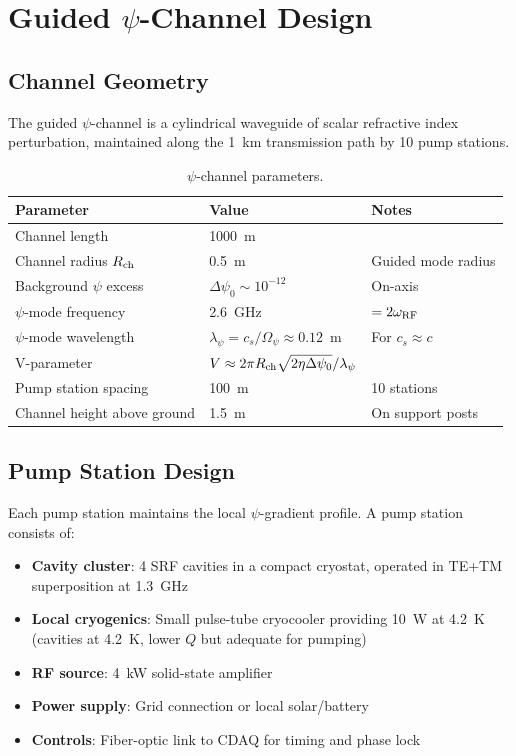 \documentclass[11pt,letterpaper]{article}
\begin{document}
\section{Guided $\psi$-Channel Design}

\subsection{Channel Geometry}

The guided $\psi$-channel is a cylindrical waveguide of scalar
refractive index perturbation, maintained along the 1~km transmission
path by 10 pump stations.

\begin{table}[H]
\caption{$\psi$-channel parameters.}
\begin{tabular}{lll}
\toprule
Parameter & Value & Notes \\
\midrule
Channel length & 1000~m & \\
Channel radius $R_{\rm ch}$ & 0.5~m & Guided mode radius \\
Background $\psi$ excess & $\Delta\psi_0 \sim 10^{-12}$ & On-axis \\
$\psi$-mode frequency & 2.6~GHz & $= 2\omega_{\rm RF}$ \\
$\psi$-mode wavelength & $\lambda_\psi = c_s/\Omega_\psi \approx 0.12$~m & For $c_s \approx c$ \\
V-parameter & $V \approx 2\pi R_{\rm ch}\sqrt{2\eta\Delta\psi_0}/\lambda_\psi$ & \\
Pump station spacing & 100~m & 10 stations \\
Channel height above ground & 1.5~m & On support posts \\
\bottomrule
\end{tabular}
\end{table}

\subsection{Pump Station Design}

Each pump station maintains the local $\psi$-gradient profile. A
pump station consists of:

\begin{itemize}
\item \textbf{Cavity cluster}: 4 SRF cavities in a compact cryostat,
operated in TE+TM superposition at 1.3~GHz
\item \textbf{Local cryogenics}: Small pulse-tube cryocooler providing
10~W at 4.2~K (cavities at 4.2~K, lower $Q$ but adequate for pumping)
\item \textbf{RF source}: 4~kW solid-state amplifier
\item \textbf{Power supply}: Grid connection or local solar/battery
\item \textbf{Controls}: Fiber-optic link to CDAQ for timing and phase lock
\end{itemize}
\end{document}
